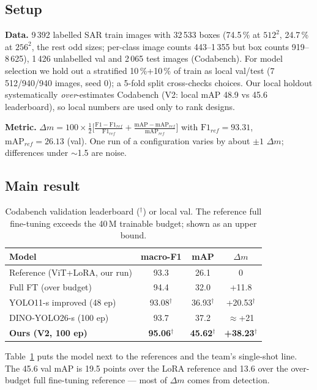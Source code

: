 \documentclass[10pt,twocolumn,letterpaper]{article}
\newcommand{\dm}{\ensuremath{\Delta m}}
\begin{document}
\subsection{Setup}
\textbf{Data.} 9\,392 labelled SAR train images with 32\,533 boxes
(74.5\,\% at $512^2$, 24.7\,\% at $256^2$, the rest odd sizes; per-class image
counts 443--1\,355 but box counts 919--8\,625), 1\,426 unlabelled val and
2\,065 test images (Codabench).
For model selection we hold out a stratified 10\,\%+10\,\% of train as local
val/test (7\,512/940/940 images, seed 0); a 5-fold split cross-checks
choices. Our local holdout systematically \emph{over}-estimates Codabench
(V2: local mAP 48.9 vs 45.6 leaderboard), so local numbers are used only to
rank designs.

\textbf{Metric.} $\dm = 100 \times \frac12\big[\frac{\mathrm{F1} -
\mathrm{F1}_{ref}}{\mathrm{F1}_{ref}} + \frac{\mathrm{mAP} -
\mathrm{mAP}_{ref}}{\mathrm{mAP}_{ref}}\big]$ with
$\mathrm{F1}_{ref}{=}93.31$, $\mathrm{mAP}_{ref}{=}26.13$ (val). One run of a
configuration varies by about $\pm 1$ \dm; differences under $\sim$1.5 are
noise.

\subsection{Main result}
\begin{table}[t]
\centering\footnotesize
\setlength{\tabcolsep}{4pt}
\begin{tabular}{@{}lccc@{}}
\toprule
Model & macro-F1 & mAP & \dm \\
\midrule
Reference (ViT+LoRA, our run) & 93.3 & 26.1 & 0 \\
Full FT (over budget) & 94.4 & 32.0 & +11.8 \\
YOLO11-s improved (48 ep) & 93.08$^\dagger$ & 36.93$^\dagger$ & +20.53$^\dagger$ \\
DINO-YOLO26-s (100 ep) & 93.7 & 37.2 & $\approx$+21 \\
\textbf{Ours (V2, 100 ep)} & \textbf{95.06}$^\dagger$ & \textbf{45.62}$^\dagger$ & \textbf{+38.23}$^\dagger$ \\
\bottomrule
\end{tabular}
\caption{Codabench validation leaderboard ($^\dagger$) or local val. The
reference full fine-tuning exceeds the 40\,M trainable budget; shown as an
upper bound.}
\label{tab:main}
\end{table}

Table~\ref{tab:main} puts the model next to the references and the team's
single-shot line. The 45.6 val mAP is 19.5 points over the LoRA reference and
13.6 over the over-budget full fine-tuning reference --- most of \dm{} comes
from detection.
\end{document}
